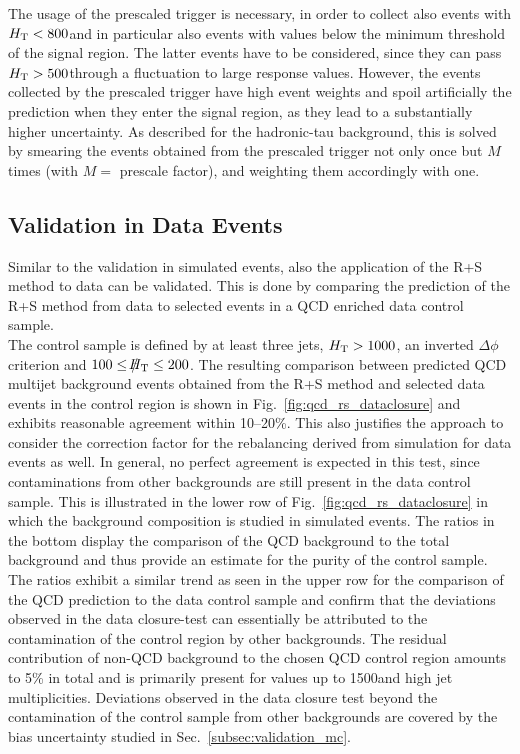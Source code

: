 The usage of the prescaled trigger is necessary, in order to collect also events with $H_{\text{T}} < 800$\gev and in particular also events with \HT values below the minimum \HT threshold of the signal region. The latter events have to be considered, since they can pass $H_{\text{T}} > 500$\gev through a fluctuation to large response values. However, the events collected by the prescaled trigger have high event weights and spoil artificially the prediction when they enter the signal region, as they lead to a substantially higher uncertainty. As described for the hadronic-tau background, this is solved by smearing the events obtained from the prescaled trigger not only once but $M$ times (with $M =$ prescale factor), and weighting them accordingly with one.

\subsection{Validation in Data Events}
Similar to the validation in simulated events, also the application of the R+S method to data can be validated. This is done by comparing the prediction of the R+S method from data to selected events in a QCD enriched data control sample. \\
The control sample is defined by at least three jets, $H_{\text{T}} > 1000$\gev, an inverted $\Delta \phi$ criterion and $100 \leq \slash\mkern-12mu{H}_{\text{T}} \leq 200$\gev. The resulting comparison between predicted QCD multijet background events obtained from the R+S method and selected data events in the control region is shown in Fig.~\ref{fig:qcd_rs_dataclosure} and exhibits reasonable agreement within 10--20\%. This also justifies the approach to consider the correction factor for the rebalancing derived from simulation for data events as well. In general, no perfect agreement is expected in this test, since contaminations from other backgrounds are still present in the data control sample. This is illustrated in the lower row of Fig.~\ref{fig:qcd_rs_dataclosure} in which the background composition is studied in simulated events. The ratios in the bottom display the comparison of the QCD background to the total background and thus provide an estimate for the purity of the control sample. The ratios exhibit a similar trend as seen in the upper row for the comparison of the QCD prediction to the data control sample and confirm that the deviations observed in the data closure-test can essentially be attributed to the contamination of the control region by other backgrounds. The residual contribution of non-QCD background to the chosen QCD control region amounts to 5\% in total and is primarily present for \HT values up to 1500\gev and high jet multiplicities. Deviations observed in the data closure test beyond the contamination of the control sample from other backgrounds are covered by the bias uncertainty studied in Sec.~\ref{subsec:validation_mc}. \\
